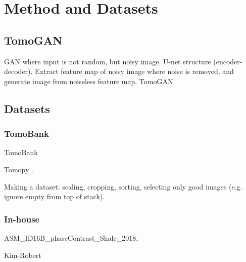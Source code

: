 \chapter{Method and Datasets}
\label{sec:method}

\section{TomoGAN}
GAN where input is not random, but noisy image. U-net structure (encoder-decoder). Extract feature map of noisy image where noise is removed, and generate image from noiseless feature map. 
TomoGAN \cite{liu2020tomogan}


\section{Datasets}
\subsection{TomoBank}
TomoBank \cite{TomoBank}

Tomopy \cite{tomopy}.

Making a dataset: scaling, cropping, sorting, selecting only good images (e.g. ignore empty from top of stack). 

\subsection{In-house}
ASM\_ID16B\_phaseContrast\_Shale\_2018, 

Kim-Robert